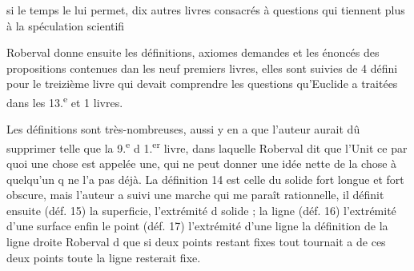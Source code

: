 \documentclass[11pt,a4paper]{article}
\begin{document}

si le temps le lui permet, dix autres livres consacrés à questions qui tiennent plus à la spéculation scientifi

Roberval donne ensuite les définitions, axiomes\add{,} demandes et les énoncés des propositions contenues dan les neuf premiers livres, elles sont suivies de 4 défini pour le treizième livre qui devait comprendre les questions qu'Euclide a traitées dans les 13.\textsuperscript{e} et 1\ill{} livres.

Les définitions sont très-nombreuses, aussi y en a\ill{} que l'auteur aurait dû supprimer telle que la 9.\textsuperscript{e} d\ill{}
1.\textsuperscript{er} livre, dans laquelle Roberval dit que l'Unit \ill{} ce par quoi une chose est appelée une, qui ne peut donner une idée nette de la chose à quelqu'un q ne l'a pas déjà. La définition 14 est celle du
solide fort longue et fort obscure, mais l'auteur a suivi une marche qui me paraît rationnelle, il définit ensuite (déf. 15) la superficie, l'extrémité d\ill{} solide ; la ligne (déf. 16) l'extrémité d'une surface\ill{}
enfin le point (déf. 17) l'extrémité d'une ligne\ill{} la définition de la ligne droite Roberval d que si deux points restant fixes tout tournait a\ill{} de ces deux points toute la ligne resterait fixe.

\end{document}
